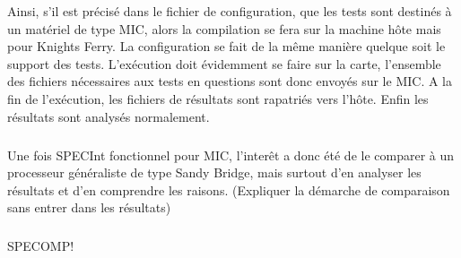 \documentclass{article}
\begin{document}
					Ainsi, s'il est précisé dans le fichier de configuration, que les tests sont destinés à un matériel de type
					MIC, alors la compilation se fera sur la machine hôte mais pour Knights Ferry. \newline
					La configuration se fait de la même manière quelque soit le support des tests. \newline
					L'exécution doit évidemment se faire sur la carte, l'ensemble des fichiers nécessaires aux tests en questions
					sont donc envoyés sur le MIC. A la fin de l'exécution, les fichiers de résultats sont rapatriés vers l'hôte. \newline
					Enfin les résultats sont analysés normalement.
					\subparagraph{}
					Une fois SPECInt fonctionnel pour MIC, l'interêt a donc été de le comparer à un processeur généraliste
					de type Sandy Bridge, mais surtout d'en analyser les résultats et d'en comprendre les raisons.
					(Expliquer la démarche de comparaison sans entrer dans les résultats)
					\subparagraph{}
					SPECOMP!
\end{document}
